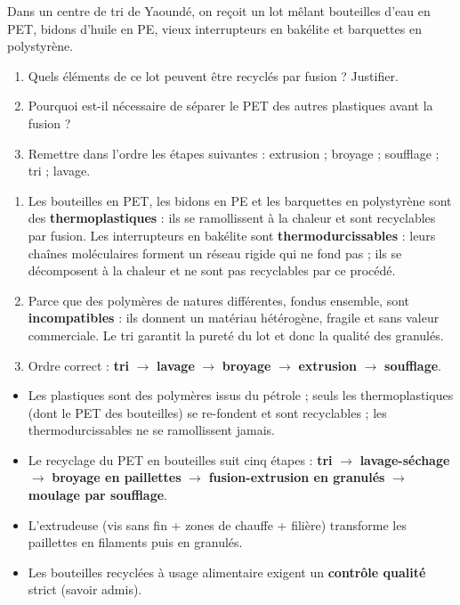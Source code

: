 \documentclass[11pt]{article}
\newcommand{\cle}[1]{{\popxbold\color{popdark}#1}}
\begin{document}
\begin{exercice}
Dans un centre de tri de Yaoundé, on reçoit un lot mêlant bouteilles d'eau en PET, bidons d'huile en PE, vieux interrupteurs en bakélite et barquettes en polystyrène.
\begin{enumerate}
\item Quels éléments de ce lot peuvent être recyclés par fusion ? Justifier.
\item Pourquoi est-il nécessaire de séparer le PET des autres plastiques avant la fusion ?
\item Remettre dans l'ordre les étapes suivantes : extrusion ; broyage ; soufflage ; tri ; lavage.
\end{enumerate}
\end{exercice}

\begin{corrige}
\begin{enumerate}
\item Les bouteilles en PET, les bidons en PE et les barquettes en polystyrène sont des \textbf{thermoplastiques} : ils se ramollissent à la chaleur et sont recyclables par fusion. Les interrupteurs en bakélite sont \textbf{thermodurcissables} : leurs chaînes moléculaires forment un réseau rigide qui ne fond pas ; ils se décomposent à la chaleur et ne sont pas recyclables par ce procédé.
\item Parce que des polymères de natures différentes, fondus ensemble, sont \textbf{incompatibles} : ils donnent un matériau hétérogène, fragile et sans valeur commerciale. Le tri garantit la pureté du lot et donc la qualité des granulés.
\item Ordre correct : \textbf{tri} $\rightarrow$ \textbf{lavage} $\rightarrow$ \textbf{broyage} $\rightarrow$ \textbf{extrusion} $\rightarrow$ \textbf{soufflage}.
\end{enumerate}
\end{corrige}

\begin{aretenir}
\begin{itemize}
\item Les plastiques sont des \cle{polymères} issus du pétrole ; seuls les \cle{thermoplastiques} (dont le PET des bouteilles) se re-fondent et sont recyclables ; les thermodurcissables ne se ramollissent jamais.
\item Le recyclage du PET en bouteilles suit cinq étapes : \textbf{tri} $\rightarrow$ \textbf{lavage-séchage} $\rightarrow$ \textbf{broyage en paillettes} $\rightarrow$ \textbf{fusion-extrusion en granulés} $\rightarrow$ \textbf{moulage par soufflage}.
\item L'\cle{extrudeuse} (vis sans fin + zones de chauffe + filière) transforme les paillettes en filaments puis en granulés.
\item Les bouteilles recyclées à usage alimentaire exigent un \textbf{contrôle qualité} strict (savoir admis).
\end{itemize}
\end{aretenir}
\end{document}
